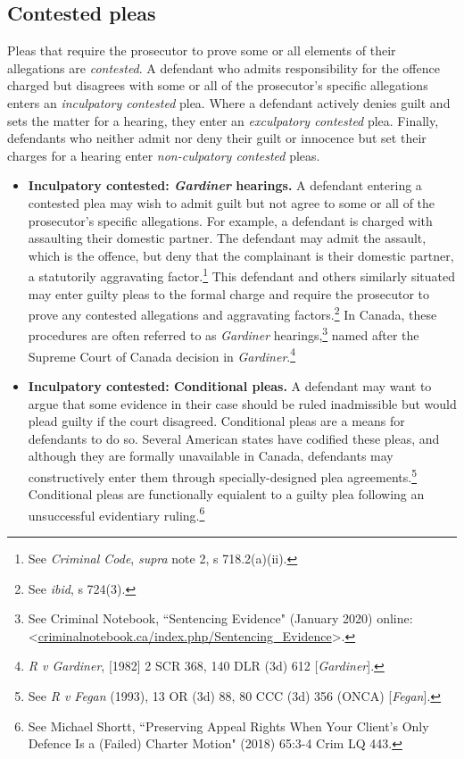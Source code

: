 \subsection{Contested pleas}

Pleas that require the prosecutor to prove some or all elements of their allegations are \textit{contested}. A defendant who admits responsibility for the offence charged but disagrees with some or all of the prosecutor's specific allegations enters an \textit{inculpatory contested} plea. Where a defendant actively denies guilt and sets the matter for a hearing, they enter an \textit{exculpatory contested} plea. Finally, defendants who neither admit nor deny their guilt or innocence but set their charges for a hearing enter \textit{non-culpatory contested} pleas.

\begin{itemize}
    \item \textbf{Inculpatory contested: \textit{Gardiner} hearings.} A defendant entering a contested plea may wish to admit guilt but not agree to some or all of the prosecutor's specific allegations. For example, a defendant is charged with assaulting their domestic partner. The defendant may admit the assault, which is the offence, but deny that the complainant is their domestic partner, a statutorily aggravating factor.\footnote{See \textit{Criminal Code}, \textit{supra} note 2, s 718.2(a)(ii).} This defendant and others similarly situated may enter guilty pleas to the formal charge and require the prosecutor to prove any contested allegations and aggravating factors.\footnote{See \textit{ibid}, s 724(3).} In Canada, these procedures are often referred to as \textit{Gardiner} hearings,\footnote{See Criminal Notebook, ``Sentencing Evidence" (January 2020) online: \textless \url{criminalnotebook.ca/index.php/Sentencing_Evidence}\textgreater.} named after the Supreme Court of Canada decision in \textit{Gardiner}.\footnote{\textit{R v Gardiner}, [1982] 2 SCR 368, 140 DLR (3d) 612 [\textit{Gardiner}].}
    
    \item \textbf{Inculpatory contested: Conditional pleas.} A defendant may want to argue that some evidence in their case should be ruled inadmissible but would plead guilty if the court disagreed. Conditional pleas are a means for defendants to do so. Several American states have codified these pleas, and although they are formally unavailable in Canada, defendants may constructively enter them through specially-designed plea agreements.\footnote{See \textit{R v Fegan} (1993), 13 OR (3d) 88, 80 CCC (3d) 356 (ONCA) [\textit{Fegan}].} Conditional pleas are functionally equialent to a guilty plea following an unsuccessful evidentiary ruling.\footnote{See Michael Shortt, ``Preserving Appeal Rights When Your Client's Only Defence Is a (Failed) Charter Motion" (2018) 65:3-4 Crim LQ 443.}
    

\end{itemize}
